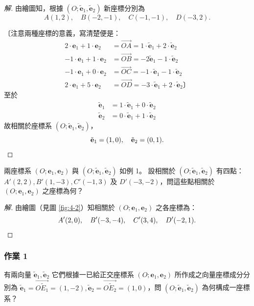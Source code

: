 \begin{proof}[解]
由繪圖知，根據 $(O; \tilde{\mathbf{e}}_1, \tilde{\mathbf{e}}_2)$ 新座標分別為
\[ A(1, 2), \quad B(-2, -1), \quad C(-1, -1), \quad D(-3, 2). \]

〔注意兩種座標的意義，寫清楚便是：
\begin{align*}
2\cdot\mathbf{e}_1 + 1\cdot\mathbf{e}_2 &= \vec{OA} = 1\cdot\tilde{\mathbf{e}}_1 + 2\cdot\tilde{\mathbf{e}}_2 \\
-1\cdot\mathbf{e}_1 + 1\cdot\mathbf{e}_2 &= \vec{OB} = -2\tilde{\mathbf{e}}_1 - 1\cdot\tilde{\mathbf{e}}_2 \\
-1\cdot\mathbf{e}_1 + 0\cdot\mathbf{e}_2 &= \vec{OC} = -1\cdot\tilde{\mathbf{e}}_1 - 1\cdot\tilde{\mathbf{e}}_2 \\
2\cdot\mathbf{e}_1 + 5\cdot\mathbf{e}_2 &= \vec{OD} = -3\cdot\tilde{\mathbf{e}}_1 + 2\cdot\tilde{\mathbf{e}}_2 \text{〕}
\end{align*}
至於
\begin{align*}
\tilde{\mathbf{e}}_1 &= 1\cdot\tilde{\mathbf{e}}_1 + 0\cdot\tilde{\mathbf{e}}_2 \\
\tilde{\mathbf{e}}_2 &= 0\cdot\tilde{\mathbf{e}}_1 + 1\cdot\tilde{\mathbf{e}}_2
\end{align*}
故相關於座標系 $(O; \tilde{\mathbf{e}}_1, \tilde{\mathbf{e}}_2)$，
\[ \tilde{\mathbf{e}}_1 = (1, 0), \quad \tilde{\mathbf{e}}_2 = (0, 1). \qedhere \]
\end{proof}

\begin{example}[例 2]
兩座標系 $(O; \mathbf{e}_1, \mathbf{e}_2)$ 與 $(O; \tilde{\mathbf{e}}_1, \tilde{\mathbf{e}}_2)$ 如例 1。
設相關於 $(O; \tilde{\mathbf{e}}_1, \tilde{\mathbf{e}}_2)$ 有四點：$A'(2, 2), B'(1, -3), C'(-1, 3)$ 及 $D'(-3, -2)$，問這些點相關於 $(O; \mathbf{e}_1, \mathbf{e}_2)$ 之座標為何？
\end{example}

\begin{proof}[解]
由繪圖（見圖 \ref{fig:4-2}）知相關於 $(O; \mathbf{e}_1, \mathbf{e}_2)$ 之各座標為：
\[ A'(2, 0), \quad B'(-3, -4), \quad C'(3, 4), \quad D'(-2, 1). \qedhere \]
\end{proof}

\subsubsection*{作業 1}
有兩向量 $\tilde{\mathbf{e}}_1, \tilde{\mathbf{e}}_2$ 它們根據一已給正交座標系 $(O; \mathbf{e}_1, \mathbf{e}_2)$ 所作成之向量座標成分分別為 $\tilde{\mathbf{e}}_1 = \vec{O\tilde{E}_1} = (1, -2), \tilde{\mathbf{e}}_2 = \vec{O\tilde{E}_2} = (1, 0)$，問 $(O; \tilde{\mathbf{e}}_1, \tilde{\mathbf{e}}_2)$ 為何構成一座標系？

